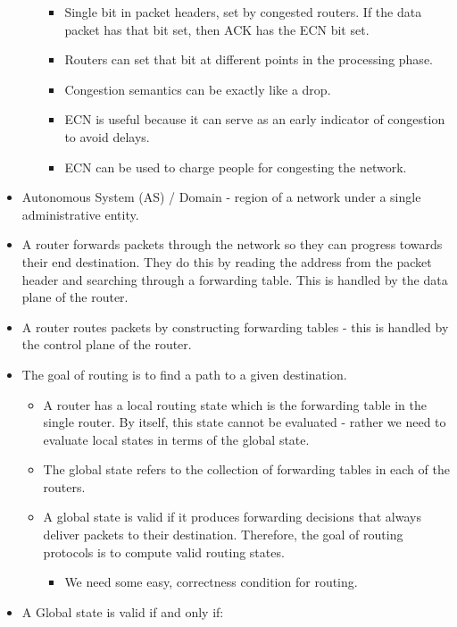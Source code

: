 \documentclass[]{article}
\providecommand{\tightlist}{%
  \setlength{\itemsep}{0pt}\setlength{\parskip}{0pt}}
\begin{document}
\begin{itemize}
\begin{itemize}
    \begin{itemize}
    \tightlist
    \item
      Single bit in packet headers, set by congested routers. If the
      data packet has that bit set, then ACK has the ECN bit set.
    \item
      Routers can set that bit at different points in the processing
      phase.
    \item
      Congestion semantics can be exactly like a drop.
    \item
      ECN is useful because it can serve as an early indicator of
      congestion to avoid delays.
    \item
      ECN can be used to charge people for congesting the network.
    \end{itemize}
  \end{itemize}
\item
  Autonomous System (AS) / Domain - region of a network under a single
  administrative entity.
\item
  A router forwards packets through the network so they can progress
  towards their end destination. They do this by reading the address
  from the packet header and searching through a forwarding table. This
  is handled by the data plane of the router.
\item
  A router routes packets by constructing forwarding tables - this is
  handled by the control plane of the router.
\item
  The goal of routing is to find a path to a given destination.

  \begin{itemize}
  \tightlist
  \item
    A router has a local routing state which is the forwarding table in
    the single router. By itself, this state cannot be evaluated -
    rather we need to evaluate local states in terms of the global
    state.
  \item
    The global state refers to the collection of forwarding tables in
    each of the routers.
  \item
    A global state is valid if it produces forwarding decisions that
    always deliver packets to their destination. Therefore, the goal of
    routing protocols is to compute valid routing states.

    \begin{itemize}
    \tightlist
    \item
      We need some easy, correctness condition for routing.
    \end{itemize}
  \end{itemize}
\item
  A Global state is valid if and only if:


\end{itemize}
\end{document}
